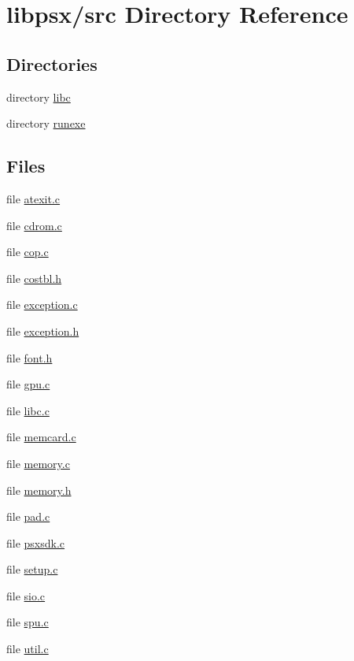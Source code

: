 \hypertarget{dir_000011}{}\section{libpsx/src Directory Reference}
\label{dir_000011}
\subsection*{Directories}
\begin{DoxyCompactItemize}
\item 
directory \hyperlink{dir_000012}{libc}
\item 
directory \hyperlink{dir_000013}{runexe}
\end{DoxyCompactItemize}
\subsection*{Files}
\begin{DoxyCompactItemize}
\item 
file \hyperlink{atexit_8c}{atexit.\+c}
\item 
file \hyperlink{cdrom_8c}{cdrom.\+c}
\item 
file \hyperlink{cop_8c}{cop.\+c}
\item 
file \hyperlink{costbl_8h}{costbl.\+h}
\item 
file \hyperlink{exception_8c}{exception.\+c}
\item 
file \hyperlink{exception_8h}{exception.\+h}
\item 
file \hyperlink{font_8h}{font.\+h}
\item 
file \hyperlink{gpu_8c}{gpu.\+c}
\item 
file \hyperlink{libc_8c}{libc.\+c}
\item 
file \hyperlink{memcard_8c}{memcard.\+c}
\item 
file \hyperlink{memory_8c}{memory.\+c}
\item 
file \hyperlink{memory_8h}{memory.\+h}
\item 
file \hyperlink{pad_8c}{pad.\+c}
\item 
file \hyperlink{psxsdk_8c}{psxsdk.\+c}
\item 
file \hyperlink{setup_8c}{setup.\+c}
\item 
file \hyperlink{sio_8c}{sio.\+c}
\item 
file \hyperlink{spu_8c}{spu.\+c}
\item 
file \hyperlink{util_8c}{util.\+c}
\end{DoxyCompactItemize}
